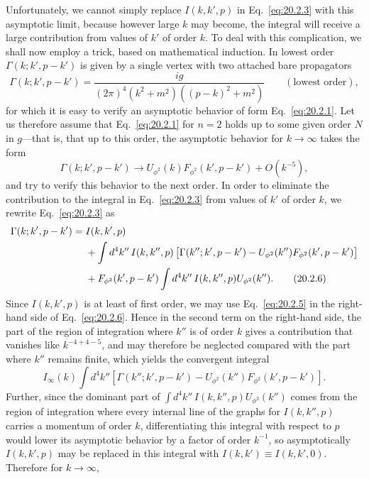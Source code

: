 Unfortunately, we cannot simply replace $I(k,k',p)$ in
Eq.~\eqref{eq:20.2.3} with this asymptotic limit, because however large $k$
may become, the integral will receive a large contribution from values of
$k'$ of order $k$. To deal with this complication, we shall now employ a
trick, based on mathematical induction. In lowest order
$\Gamma(k;k',p-k')$ is given by a single vertex with two attached bare
propagators
\[
 \Gamma(k;k',p-k')
 =\frac{ig}{(2\pi)^4(k^2+m^2)((p-k)^2+m^2)}
 \qquad(\text{lowest order}),
\]
for which it is easy to verify an asymptotic behavior of form
Eq.~\eqref{eq:20.2.1}. Let us therefore assume that
Eq.~\eqref{eq:20.2.1} for $n=2$ holds up to some given order $N$ in $g$---that
is, that up to this order, the asymptotic behavior for $k\to\infty$ takes the
form
\begin{equation}
 \Gamma(k;k',p-k')\longrightarrow
 U_{\phi^2}(k)F_{\phi^2}(k',p-k')+O(k^{-5}),
 \tag{20.2.5}\label{eq:20.2.5}
\end{equation}
and try to verify this behavior to the next order. In order to eliminate the
contribution to the integral in Eq.~\eqref{eq:20.2.3} from values of $k'$ of
order $k$, we rewrite Eq.~\eqref{eq:20.2.3} as
\begin{align}
 \Gamma(k;k',p-k')={}&I(k,k',p)
 \notag\\
 &+\int d^4k''\,I(k,k'',p)
 \left[\Gamma(k'';k',p-k')
 -U_{\phi^2}(k'')F_{\phi^2}(k',p-k')\right]
 \notag\\
 &+F_{\phi^2}(k',p-k')
 \int d^4k''\,I(k,k'',p)U_{\phi^2}(k'').
 \tag{20.2.6}\label{eq:20.2.6}
\end{align}
Since $I(k,k',p)$ is at least of first order, we may use
Eq.~\eqref{eq:20.2.5} in the right-hand side of Eq.~\eqref{eq:20.2.6}.
Hence in the second term on the right-hand side, the part of the region of
integration where $k''$ is of order $k$ gives a contribution that vanishes
like $k^{-4+4-5}$, and may therefore be neglected compared with the part
where $k''$ remains finite, which yields the convergent integral
\[
 I_\infty(k)\int d^4k''
 \left[\Gamma(k'';k',p-k')
 -U_{\phi^2}(k'')F_{\phi^2}(k',p-k')\right].
\]
Further, since the dominant part of
$\int d^4k''\,I(k,k'',p)U_{\phi^2}(k'')$ comes from the region of
integration where every internal line of the graphs for $I(k,k'',p)$ carries
a momentum of order $k$, differentiating this integral with respect to $p$
would lower its asymptotic behavior by a factor of order $k^{-1}$, so
asymptotically $I(k,k',p)$ may be replaced in this integral with
$I(k,k')\equiv I(k,k',0)$. Therefore for $k\to\infty$,
